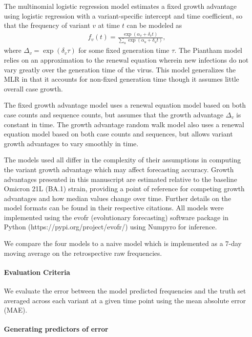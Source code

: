 \documentclass[11pt,oneside,letterpaper]{article}
\begin{document}
The multinomial logistic regression model estimates a fixed growth advantage using logistic regression with a variant-specific intercept and time coefficient, so that the frequency of variant $v$ at time $t$ can be modeled as
\begin{align*}
    f_{v}(t) = \frac{\exp(\alpha_{v} + \delta_{v} t)}{\sum_{u} \exp(\alpha_{u} + \delta_{u} t)},
\end{align*}
where $\Delta_{v} = \exp(\delta_{v} \tau)$ for some fixed generation time $\tau$.
The Piantham model relies on an approximation to the renewal equation wherein new infections do not vary greatly over the generation time of the virus.
This model generalizes the MLR in that it accounts for non-fixed generation time though it assumes little overall case growth. \cite{piantham2021estimating}

The fixed growth advantage model uses a renewal equation model based on both case counts and sequence counts, but assumes that the growth advantage $\Delta_{v}$ is constant in time. \cite{figgins2022sars}
The growth advantage random walk model also uses a renewal equation model based on both case counts and sequences, but allows variant growth advantages to vary smoothly in time. \cite{figgins2022sars}

The models used all differ in the complexity of their assumptions in computing the variant growth advantage which may affect forecasting accuracy.
Growth advantages presented in this manuscript are estimated relative to the baseline Omicron 21L (BA.1) strain, providing a point of reference for competing growth advantages and how median values change over time.
Further details on the model formats can be found in their respective citations.
All models were implemented using the evofr (evolutionary forecasting) software package in Python (https://pypi.org/project/evofr/) using Numpyro for inference.

We compare the four models to a naive model which is implemented as a 7-day moving average on the retrospective raw frequencies.

\paragraph{Evaluation Criteria}

We evaluate the error between the model predicted frequencies and the truth set averaged across each variant at a given time point using the mean absolute error (MAE).
\paragraph{Generating predictors of error}
\end{document}
